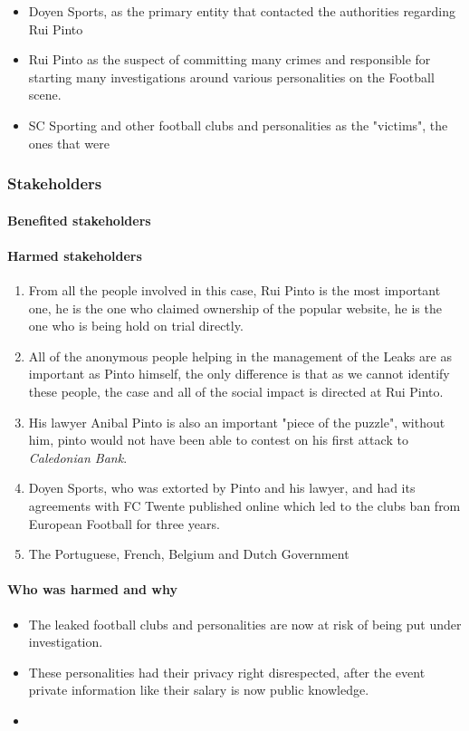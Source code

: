 \begin{itemize}
    \item Doyen Sports, as the primary entity that contacted the authorities regarding Rui Pinto
    \item Rui Pinto as the suspect of committing many crimes and responsible for starting many investigations around various personalities on the Football scene.
    \item SC Sporting and other football clubs and personalities as the "victims", the ones that were 
    
\end{itemize}

\subsubsection{Stakeholders}

\paragraph{Benefited stakeholders}


\paragraph{Harmed stakeholders}
    \begin{enumerate}
        \item From all the people involved in this case, Rui Pinto is the most important one, he is the one who claimed ownership of the popular website, he is the one who is being hold on trial directly.
        \item All of the anonymous people helping in the management of the Leaks are as important as Pinto himself, the only difference is that as we cannot identify these people, the case and all of the social impact is directed at Rui Pinto.
        \item His lawyer Anibal Pinto is also an important "piece of the puzzle", without him, pinto would not have been able to contest on his first attack to \textit{Caledonian Bank}.
        \item Doyen Sports, who was extorted by Pinto and his lawyer, and had its agreements with FC Twente published online which led to the clubs ban from European Football for three years.
        \item The Portuguese, French, Belgium and Dutch Government
    \end{enumerate}

\paragraph{Who was harmed and why}
\begin{itemize}
    \item The leaked football clubs and personalities are now at risk of being put under investigation.
    \item These personalities had their privacy right disrespected, after the event private information like their salary is now public knowledge.
    \item 
\end{itemize}

